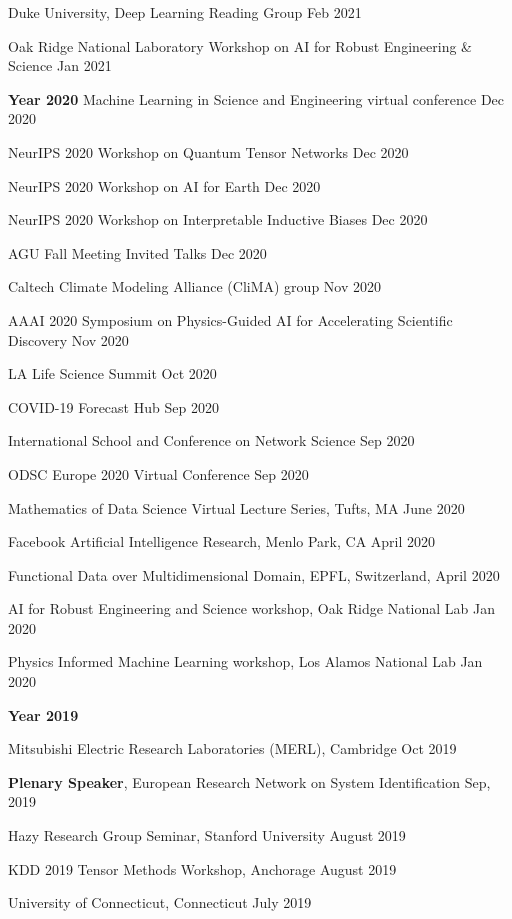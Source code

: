 \documentclass[margin,line]{res}
\begin{document}
\begin{resume}
 Duke University, Deep Learning Reading Group \hfill{Feb 2021}

Oak Ridge National Laboratory Workshop on AI for Robust Engineering \& Science \hfill{Jan 2021}

 {\bf Year  2020}
Machine Learning in Science and Engineering virtual conference \hfill{Dec 2020}


NeurIPS 2020 Workshop on Quantum Tensor Networks \hfill{Dec 2020}

NeurIPS 2020 Workshop on AI for Earth \hfill{Dec 2020}

NeurIPS 2020 Workshop on Interpretable Inductive Biases \hfill{Dec 2020}

AGU Fall Meeting Invited Talks \hfill{Dec 2020}

Caltech Climate Modeling Alliance (CliMA) group  \hfill{Nov 2020}

AAAI 2020 Symposium on Physics-Guided AI for Accelerating Scientific Discovery \hfill{Nov 2020}

LA Life Science Summit \hfill{Oct 2020}

COVID-19 Forecast Hub  \hfill{Sep 2020}
 
International School and Conference on Network Science  \hfill{Sep 2020}
 
 
 ODSC Europe 2020 Virtual Conference \hfill{Sep 2020}

 
 Mathematics of Data Science Virtual Lecture Series, Tufts, MA \hfill{June 2020}
 
 
Facebook Artificial Intelligence Research,  Menlo Park, CA \hfill{April 2020}


 Functional Data over Multidimensional Domain, EPFL, Switzerland,   \hfill{April 2020}
 
 
AI for Robust Engineering and Science workshop,  Oak Ridge National Lab \hfill{Jan 2020}
 
 
Physics Informed Machine Learning workshop,  Los Alamos National Lab \hfill {Jan 2020}


 {\bf Year  2019}
 

Mitsubishi Electric Research Laboratories (MERL), Cambridge  \hfill {Oct  2019}


\textbf{Plenary Speaker},  European Research Network on System Identification   \hfill {Sep, 2019}


Hazy Research Group Seminar,  Stanford University  \hfill {August 2019}

KDD 2019 Tensor Methods Workshop, Anchorage \hfill{August 2019}

University  of Connecticut,   Connecticut \hfill{July 2019}


\end{resume}
\end{document}
